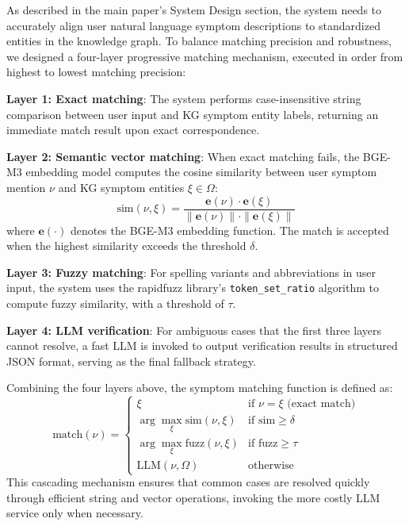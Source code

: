 \documentclass[12pt]{article}
\begin{document}
As described in the main paper's System Design section, the system needs to accurately align user natural language symptom descriptions to standardized entities in the knowledge graph. To balance matching precision and robustness, we designed a four-layer progressive matching mechanism, executed in order from highest to lowest matching precision:

\textbf{Layer 1: Exact matching}: The system performs case-insensitive string comparison between user input and KG symptom entity labels, returning an immediate match result upon exact correspondence.

\textbf{Layer 2: Semantic vector matching}: When exact matching fails, the BGE-M3 embedding model computes the cosine similarity between user symptom mention $\nu$ and KG symptom entities $\xi \in \Omega$:
\begin{equation}\label{eq:sim}
\mathrm{sim}(\nu, \xi) = \frac{\mathbf{e}(\nu) \cdot \mathbf{e}(\xi)}{\|\mathbf{e}(\nu)\| \cdot \|\mathbf{e}(\xi)\|}
\end{equation}
where $\mathbf{e}(\cdot)$ denotes the BGE-M3 embedding function. The match is accepted when the highest similarity exceeds the threshold $\delta$.

\textbf{Layer 3: Fuzzy matching}: For spelling variants and abbreviations in user input, the system uses the rapidfuzz library's \texttt{token\_set\_ratio} algorithm to compute fuzzy similarity, with a threshold of $\tau$.

\textbf{Layer 4: LLM verification}: For ambiguous cases that the first three layers cannot resolve, a fast LLM is invoked to output verification results in structured JSON format, serving as the final fallback strategy.

Combining the four layers above, the symptom matching function is defined as:
\begin{equation}\label{eq:match}
\mathrm{match}(\nu) = \begin{cases}
\xi & \text{if } \nu = \xi \text{ (exact match)} \\
\arg\max_{\xi} \mathrm{sim}(\nu, \xi) & \text{if } \mathrm{sim} \geq \delta \\
\arg\max_{\xi} \mathrm{fuzz}(\nu, \xi) & \text{if } \mathrm{fuzz} \geq \tau \\
\mathrm{LLM}(\nu, \Omega) & \text{otherwise}
\end{cases}
\end{equation}
This cascading mechanism ensures that common cases are resolved quickly through efficient string and vector operations, invoking the more costly LLM service only when necessary.
\end{document}
